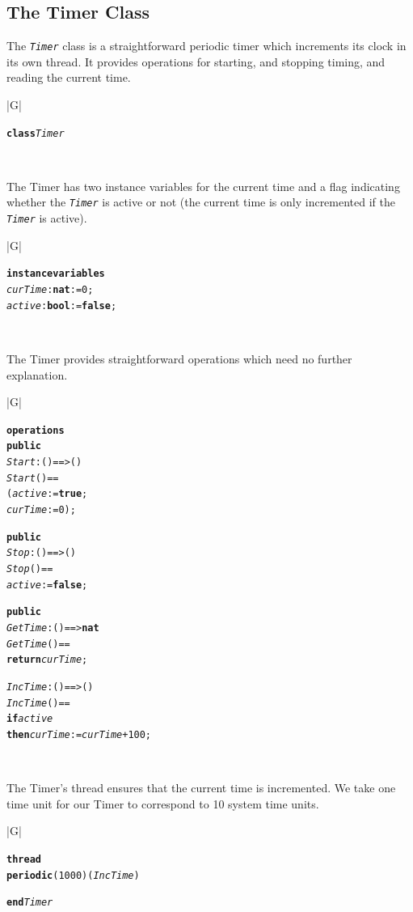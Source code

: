 \documentclass[\pformat,12pt,twoside]{article}
\newenvironment{VDMgray}%
{\begin{tabular}{|G|}\hline\small\begin{alltt}}%
{\end{alltt}\normalsize\\
 \hline\end{tabular}}
\begin{document}
\subsection{The Timer Class}

The \texttt{\emph{Timer}} class is a straightforward periodic timer
which increments its clock in its own thread. It provides operations
for starting, and stopping timing, and reading the current time.

\begin{VDMgray}
\textbf{class} \textit{Timer}
\end{VDMgray}


The Timer has two instance variables for the current time and a flag
indicating whether the \texttt{\emph{Timer}} is active or not (the
current time is only incremented if the \texttt{\emph{Timer}} is
active).

\begin{VDMgray}
\textbf{instance} \textbf{variables}
 \textit{curTime} : \textbf{nat} := 0;
 \textit{active} : \textbf{bool} := \textbf{false};
\end{VDMgray}


The Timer provides straightforward operations which need no further 
explanation.

\begin{VDMgray}
\textbf{operations}
 \textbf{public}
 \textit{Start} : () ==\texttt{>} ()
 \textit{Start}() ==
   (\textit{active} := \textbf{true};
    \textit{curTime} := 0);

 \textbf{public}
 \textit{Stop} : () ==\texttt{>} ()
 \textit{Stop}() ==
   \textit{active} := \textbf{false};

 \textbf{public}
 \textit{GetTime} : () ==\texttt{>} \textbf{nat}
 \textit{GetTime}() ==
   \textbf{return} \textit{curTime};

 \textit{IncTime}: () ==\texttt{>} ()
 \textit{IncTime}() ==
   \textbf{if} \textit{active}
   \textbf{then} \textit{curTime} := \textit{curTime} + 100;
\end{VDMgray}


The Timer's thread ensures that the current time is incremented. 
We take one time unit for our Timer to correspond to 10 system 
time units.

\begin{VDMgray}
\textbf{thread}
 \textbf{periodic}(1000)(\textit{IncTime})

\textbf{end} \textit{Timer
}
\end{VDMgray}

\newpage
\end{document}
